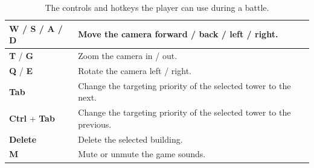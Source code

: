 \begin{table}[H]
\begin{tabular}{m{}m{}}
        \textbf{W} / \textbf{S} / \textbf{A} / \textbf{D} & Move the camera forward / back / left / right.                       \\\midrule
        \textbf{T} / \textbf{G}                           & Zoom the camera in / out.                                            \\\midrule
        \textbf{Q} / \textbf{E}                           & Rotate the camera left / right.                                      \\\midrule
        \textbf{Tab}                                      & Change the targeting priority of the selected tower to the next.     \\\midrule
        \textbf{Ctrl} + \textbf{Tab}                      & Change the targeting priority of the selected tower to the previous. \\\midrule
        \textbf{Delete}                                   & Delete the selected building.                                        \\\midrule
        \textbf{M}                                        & Mute or unmute the game sounds.                                      \\
        \bottomrule
    \end{tabular}
    \caption{The controls and hotkeys the player can use during a battle.}
    \label{tab:controls}
\end{table}


